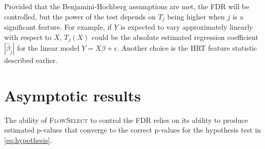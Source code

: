 \documentclass{article}
\newcommand{\FlowSelect}{\textsc{FlowSelect}\xspace}
\begin{document}
Provided that the Benjamini-Hochberg assumptions are met, the FDR will be controlled, but the power of the test depends on $T_j$ being higher when $j$ is a significant feature.
For example, if $Y$ is expected to vary approximately linearly with respect to $X$, $T_{j}(X)$ could be the absolute estimated regression coefficient $|\hat \beta_{j}|$ for the linear model $Y = X\beta + \epsilon$.
Another choice is the HRT feature statistic described earlier.


\section{Asymptotic results}
\label{sec:asymptotic}

The ability of \FlowSelect to control the FDR relies on its ability to produce estimated p-values that converge to the correct p-values for the hypothesis test in \cref{eq:hypothesis}.
\end{document}
